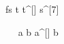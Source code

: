 \begin{eqcode}{f}{s}{}{}
  t \in {} \lend
  t^{[\iter]} \gets  s^{[7]} \lend
   \lend
\end{eqcode}

\begin{eqcode}{\mu}{\ }{\ }{}
  a \in {} \lend
  b  \lend
  a^{[\iter]} \gets \iter \cdot \iter \cdot b \lend
   \lend
\end{eqcode}
